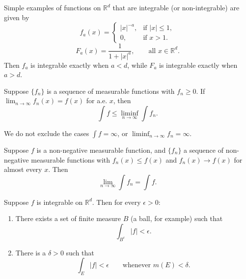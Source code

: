 \begin{example}
  Simple examples of functions on $\mathbb{R}^d$ that are integrable
  (or non-integrable) are given by
  \begin{equation}
    f_a(x) =
    \begin{cases}
      |x|^{-a}, & \text{if } |x| \leq 1,\\
      0, & \text{if } x > 1.
    \end{cases}
  \end{equation}
  \begin{equation}
    F_a(x) = \frac{1}{1 + |x|^a}, \qquad \text{all } x \in \mathbb{R}^d.
  \end{equation}
  Then $f_a$ is integrable exactly when $a < d$, while $F_a$ is integrable
  exactly when $a > d$.
\end{example}

\begin{lemma}[Fatou]
  Suppose $\{f_n\}$ is a sequence of measurable functions with $f_n \geq 0$.
  If $\lim_{n \to \infty} f_n(x) = f(x)$ for a.e. $x$, then
  \begin{equation}
    \int f \leq \liminf_{n \to \infty} \int f_n.
  \end{equation}
\end{lemma}

\begin{remark}
  We do not exclude the cases $\int f = \infty$,
  or $\liminf_{n \to \infty} f_n = \infty$.
\end{remark}

\begin{corollary}
  Suppose $f$ is a non-negative measurable function, and $\{f_n\}$ a sequence
  of non-negative measurable functions with
  $f_n(x) \leq f(x)$ and $f_n(x) \to f(x)$ for almost every $x$. Then
  \begin{equation}
    \lim_{n \to \infty} \int f_n = \int f.
  \end{equation}
\end{corollary}

\begin{proposition}
  Suppose $f$ is integrable on $\mathbb{R}^d$. Then for every $\epsilon > 0$:
  \begin{enumerate}
    \renewcommand{\theenumi}{\roman{enumi}}
    \item There exists a set of finite measure $B$ (a ball, for example) such that
    \begin{equation}
      \int_{B^c} |f| < \epsilon.
    \end{equation}
    \item There is a $\delta > 0$ such that
    \begin{equation}
      \int_E |f| < \epsilon \qquad \text{whenever } m(E) < \delta.
    \end{equation}
  \end{enumerate}
\end{proposition}

